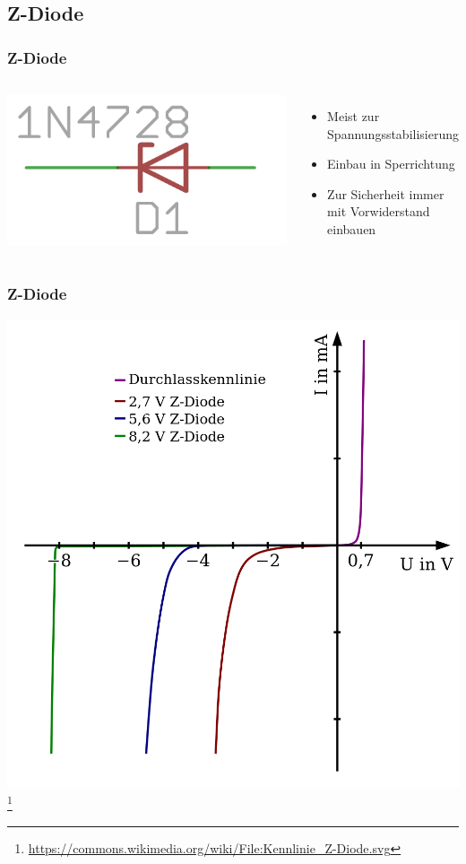 \subsection*{Z-Diode}
\begin{frame}
  \frametitle{Z-Diode}
  \begin{columns}[c]
    \begin{center}
      \includegraphics[width=.8\textwidth,height=.3\textheight,keepaspectratio]{a05/z-diode.png}
    \end{center}
    \begin{itemize}
      \item Meist zur Spannungsstabilisierung
      \item Einbau in Sperrichtung
      \item Zur Sicherheit immer mit Vorwiderstand einbauen
    \end{itemize}
  \end{columns}
\end{frame}

\begin{frame}
  \frametitle{Z-Diode}
  \begin{center}
    \includegraphics[width=.7\textwidth,height=.75\textheight,keepaspectratio]{a05/Kennlinie_Z-Diode.png}
    \footnote{\tiny \url{https://commons.wikimedia.org/wiki/File:Kennlinie_Z-Diode.svg}}
  \end{center}
\end{frame}

